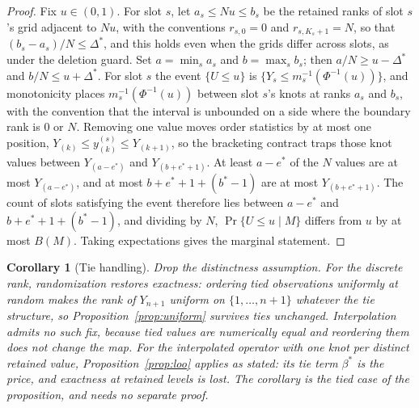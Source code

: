 \documentclass[11pt]{article}
\newtheorem{corollary}[proposition]{Corollary}
\theoremstyle{remark}
\begin{document}
\begin{proof}
Fix $u \in (0,1)$. For slot $s$, let $a_s \le Nu \le b_s$ be the retained ranks of
slot $s$'s grid adjacent to $Nu$, with the conventions $r_{s,0} = 0$ and
$r_{s, K_s + 1} = N$, so that $(b_s - a_s)/N \le \Delta^*$, and this holds even
when the grids differ across slots, as under the deletion guard. Set
$a = \min_s a_s$ and $b = \max_s b_s$; then $a/N \ge u - \Delta^*$ and
$b/N \le u + \Delta^*$. For slot $s$ the event $\{U \le u\}$ is
$\{Y_s \le m_s^{-1}(\Phi^{-1}(u))\}$, and monotonicity places
$m_s^{-1}(\Phi^{-1}(u))$ between slot $s$'s knots at ranks $a_s$ and $b_s$, with the
convention that the interval is unbounded on a side where the boundary rank is $0$ or
$N$. Removing one value moves order statistics by at most one position,
$Y_{(k)} \le y^{(s)}_{(k)} \le Y_{(k+1)}$, so the bracketing contract traps those
knot values between $Y_{(a - e^*)}$ and $Y_{(b + e^* + 1)}$. At least $a - e^*$ of
the $N$ values are at most $Y_{(a - e^*)}$, and at most $b + e^* + 1 + (b^* - 1)$
are at most $Y_{(b + e^* + 1)}$. The count of slots satisfying the event therefore
lies between $a - e^*$ and $b + e^* + 1 + (b^* - 1)$, and dividing by $N$,
$\Pr\{U \le u \mid M\}$ differs from $u$ by at most $B(M)$. Taking expectations
gives the marginal statement.
\end{proof}

\begin{corollary}[Tie handling]\label{cor:ties}
Drop the distinctness assumption. For the discrete rank, randomization restores
exactness: ordering tied observations uniformly at random makes the rank of $Y_{n+1}$
uniform on $\{1, \dots, n+1\}$ whatever the tie structure, so
Proposition~\ref{prop:uniform} survives ties unchanged. Interpolation admits no such
fix, because tied values are numerically equal and reordering them does not change the
map. For the interpolated operator with one knot per distinct retained value,
Proposition~\ref{prop:loo} applies as stated: its tie term $\beta^*$ is the price,
and exactness at retained levels is lost. The corollary is the tied case of the
proposition, and needs no separate proof.
\end{corollary}
\end{document}
